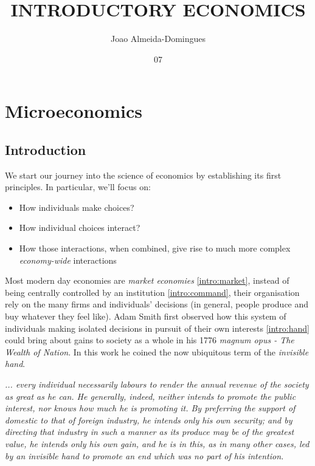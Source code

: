 \documentclass[english,course, draft]{Notes}
\title{ INTRODUCTORY ECONOMICS}
\author{Joao Almeida-Domingues}
\date{07}{01}{2019}
\newcommand\quo[1]{\begin{displayquote}\ita{\large{#1}}\end{displayquote}}
\newcommand{\ita}[1]{\textit{#1}}
\begin{document}
\newpage

\section{Microeconomics}

\subsection{Introduction}

We start our journey into the science of economics by establishing its first principles. In particular, we'll focus on:

\begin{itemize}
	\item How individuals make choices?
	\item How individual choices interact?
	\item How those interactions, when combined, give rise to much more complex \ita{economy-wide} interactions
\end{itemize}



\par{Most modern day economies are \ita{market economies} \ref{intro:market}, instead of being centrally controlled by an institution \ref{intro:command}, their organisation rely on the many firms and individuals' decisions (in general, people produce and buy whatever they feel like). Adam Smith first observed how this system of individuals making isolated decisions in pursuit of their own interests \ref{intro:hand} could bring about gains to society as a whole in his 1776 \ita{magnum opus - The Wealth of Nation}. In this work he coined the now ubiquitous term of the \ita{invisible hand}.}

\quo{... every individual necessarily labours to render the annual revenue of the society as great as he can. He generally, indeed, neither intends to promote the public interest, nor knows how much he is promoting it. By preferring the support of domestic to that of foreign industry, he intends only his own security; and by directing that industry in such a manner as its produce may be of the greatest value, he intends only his own gain, and he is in this, as in many other cases, led by an invisible hand to promote an end which was no part of his intention.}
\end{document}
